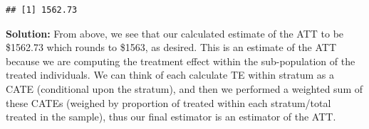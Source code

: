 \documentclass[
]{article}
\newenvironment{Shaded}{\begin{snugshade}}{\end{snugshade}}
\newcommand{\AttributeTok}[1]{\textcolor[rgb]{0.13,0.29,0.53}{#1}}
\newcommand{\ControlFlowTok}[1]{\textcolor[rgb]{0.13,0.29,0.53}{\textbf{#1}}}
\newcommand{\DecValTok}[1]{\textcolor[rgb]{0.00,0.00,0.81}{#1}}
\newcommand{\FunctionTok}[1]{\textcolor[rgb]{0.13,0.29,0.53}{\textbf{#1}}}
\newcommand{\NormalTok}[1]{#1}
\newcommand{\OtherTok}[1]{\textcolor[rgb]{0.56,0.35,0.01}{#1}}
\newcommand{\SpecialCharTok}[1]{\textcolor[rgb]{0.81,0.36,0.00}{\textbf{#1}}}
\begin{document}
\begin{Shaded}
\end{Shaded}

\begin{verbatim}
## [1] 1562.73
\end{verbatim}

\textbf{Solution:} From above, we see that our calculated estimate of
the ATT to be \$1562.73 which rounds to \$1563, as desired. This is an
estimate of the ATT because we are computing the treatment effect within
the sub-population of the treated individuals. We can think of each
calculate TE within stratum as a CATE (conditional upon the stratum),
and then we performed a weighted sum of these CATEs (weighed by
proportion of treated within each stratum/total treated in the sample),
thus our final estimator is an estimator of the ATT.
\end{document}
